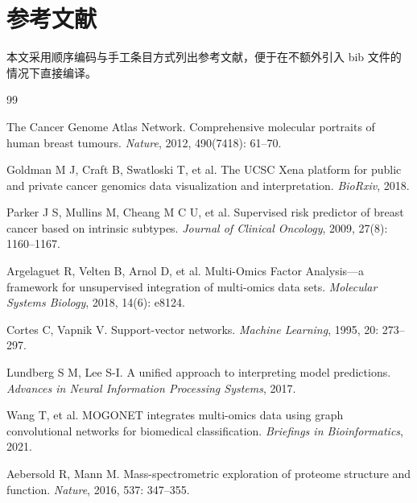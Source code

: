 \section{参考文献}

本文采用顺序编码与手工条目方式列出参考文献，便于在不额外引入 bib 文件的情况下直接编译。

\begin{thebibliography}{99}

The Cancer Genome Atlas Network.
Comprehensive molecular portraits of human breast tumours.
\emph{Nature}, 2012, 490(7418): 61--70.

Goldman M J, Craft B, Swatloski T, et al.
The UCSC Xena platform for public and private cancer genomics data visualization and interpretation.
\emph{BioRxiv}, 2018.

Parker J S, Mullins M, Cheang M C U, et al.
Supervised risk predictor of breast cancer based on intrinsic subtypes.
\emph{Journal of Clinical Oncology}, 2009, 27(8): 1160--1167.

Argelaguet R, Velten B, Arnol D, et al.
Multi-Omics Factor Analysis—a framework for unsupervised integration of multi-omics data sets.
\emph{Molecular Systems Biology}, 2018, 14(6): e8124.

Cortes C, Vapnik V.
Support-vector networks.
\emph{Machine Learning}, 1995, 20: 273--297.

Lundberg S M, Lee S-I.
A unified approach to interpreting model predictions.
\emph{Advances in Neural Information Processing Systems}, 2017.

Wang T, et al.
MOGONET integrates multi-omics data using graph convolutional networks for biomedical classification.
\emph{Briefings in Bioinformatics}, 2021.

Aebersold R, Mann M.
Mass-spectrometric exploration of proteome structure and function.
\emph{Nature}, 2016, 537: 347--355.

\end{thebibliography}
